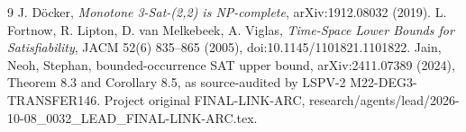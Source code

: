 \documentclass[11pt]{article}
\begin{document}
\begin{thebibliography}{9}
 J. D\"ocker,
\emph{Monotone 3-Sat-(2,2) is NP-complete},
arXiv:1912.08032 (2019).
 L. Fortnow, R. Lipton, D. van Melkebeek,
A. Viglas, \emph{Time-Space Lower Bounds for Satisfiability},
JACM 52(6) 835--865 (2005), doi:10.1145/1101821.1101822.
 Jain, Neoh, Stephan,
bounded-occurrence SAT upper bound,
arXiv:2411.07389 (2024), Theorem 8.3 and Corollary 8.5,
as source-audited by LSPV-2 M22-DEG3-TRANSFER146.
 Project original FINAL-LINK-ARC,
research/agents/lead/2026-10-08\_0032\_LEAD\_FINAL-LINK-ARC.tex.
\end{thebibliography}
\end{document}
